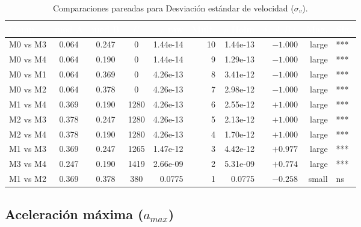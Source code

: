 \documentclass[12pt,a4paper,oneside]{book}
\begin{document}
\begin{table}[H]
\centering
\small
\caption{Comparaciones pareadas para Desviación estándar de velocidad ($\sigma_v$).}
\renewcommand{\arraystretch}{1.15}
\begin{tabular}{lcccrrrrrl}
\toprule
\rowcolor{primary}
\textcolor{white}{\textbf{Comp.}} & \textcolor{white}{\textbf{med A}} & \textcolor{white}{\textbf{med B}} & \textcolor{white}{\textbf{$U$}} & \textcolor{white}{\textbf{$p$ raw}} & \textcolor{white}{\textbf{Mult.}} & \textcolor{white}{\textbf{$p$ Holm}} & \textcolor{white}{\textbf{$\delta(A,B)$}} & \textcolor{white}{\textbf{Mag.}} & \textcolor{white}{\textbf{Sig.}} \\
\midrule
M0 vs M3 & 0.064 & 0.247 & 0 & 1.44e-14 & 10 & 1.44e-13 & $-1.000$ & large & *** \\
M0 vs M4 & 0.064 & 0.190 & 0 & 1.44e-14 & 9 & 1.29e-13 & $-1.000$ & large & *** \\
M0 vs M1 & 0.064 & 0.369 & 0 & 4.26e-13 & 8 & 3.41e-12 & $-1.000$ & large & *** \\
M0 vs M2 & 0.064 & 0.378 & 0 & 4.26e-13 & 7 & 2.98e-12 & $-1.000$ & large & *** \\
M1 vs M4 & 0.369 & 0.190 & 1280 & 4.26e-13 & 6 & 2.55e-12 & $+1.000$ & large & *** \\
M2 vs M3 & 0.378 & 0.247 & 1280 & 4.26e-13 & 5 & 2.13e-12 & $+1.000$ & large & *** \\
M2 vs M4 & 0.378 & 0.190 & 1280 & 4.26e-13 & 4 & 1.70e-12 & $+1.000$ & large & *** \\
M1 vs M3 & 0.369 & 0.247 & 1265 & 1.47e-12 & 3 & 4.42e-12 & $+0.977$ & large & *** \\
M3 vs M4 & 0.247 & 0.190 & 1419 & 2.66e-09 & 2 & 5.31e-09 & $+0.774$ & large & *** \\
M1 vs M2 & 0.369 & 0.378 & 380 & 0.0775 & 1 & 0.0775 & $-0.258$ & small & ns \\
\bottomrule
\end{tabular}
\end{table}

\subsection{Aceleración máxima ($a_{max}$)}
\end{document}
